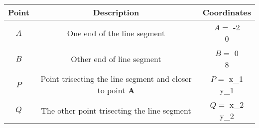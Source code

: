 \begin{center}
    \begin{tabular}{|c|c|c|} 
        \hline
            \textbf{Point} & \textbf{Description} & \textbf{Coordinates} \\ 
        \hline
            $A$   & One end of the line segment & $A =$ \myvec{-2 \\ 0} \\ 
        \hline
            $B$   & Other end of line segment & $B =$ \myvec{0 \\ 8}\\ 
        \hline
	    $P$   & Point trisecting the line segment and closer to point \textbf{A} & $P  =$ \myvec{x_1 \\ y_1}\\ 
        \hline
	    $Q$   & The other point trisecting the line segment & $Q  =$ \myvec{x_2 \\ y_2}\\ 
	    \hline
    \end{tabular}
\end{center}  
